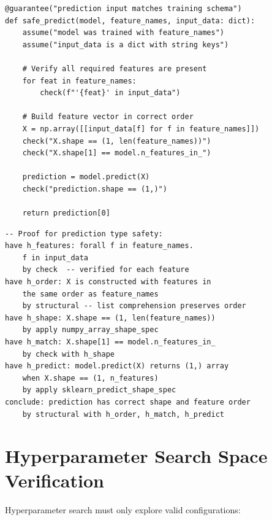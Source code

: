 \documentclass[11pt,a4paper]{report}
\theoremstyle{definition}
\theoremstyle{plain}
\begin{document}
\begin{lstlisting}[style=synhopy]
@guarantee("prediction input matches training schema")
def safe_predict(model, feature_names, input_data: dict):
    assume("model was trained with feature_names")
    assume("input_data is a dict with string keys")

    # Verify all required features are present
    for feat in feature_names:
        check(f"'{feat}' in input_data")

    # Build feature vector in correct order
    X = np.array([[input_data[f] for f in feature_names]])
    check("X.shape == (1, len(feature_names))")
    check("X.shape[1] == model.n_features_in_")

    prediction = model.predict(X)
    check("prediction.shape == (1,)")

    return prediction[0]
\end{lstlisting}

\begin{lstlisting}[style=proof]
-- Proof for prediction type safety:
have h_features: forall f in feature_names.
    f in input_data
    by check  -- verified for each feature
have h_order: X is constructed with features in
    the same order as feature_names
    by structural -- list comprehension preserves order
have h_shape: X.shape == (1, len(feature_names))
    by apply numpy_array_shape_spec
have h_match: X.shape[1] == model.n_features_in_
    by check with h_shape
have h_predict: model.predict(X) returns (1,) array
    when X.shape == (1, n_features)
    by apply sklearn_predict_shape_spec
conclude: prediction has correct shape and feature order
    by structural with h_order, h_match, h_predict
\end{lstlisting}

\section{Hyperparameter Search Space Verification}

Hyperparameter search must only explore valid configurations:
\end{document}
